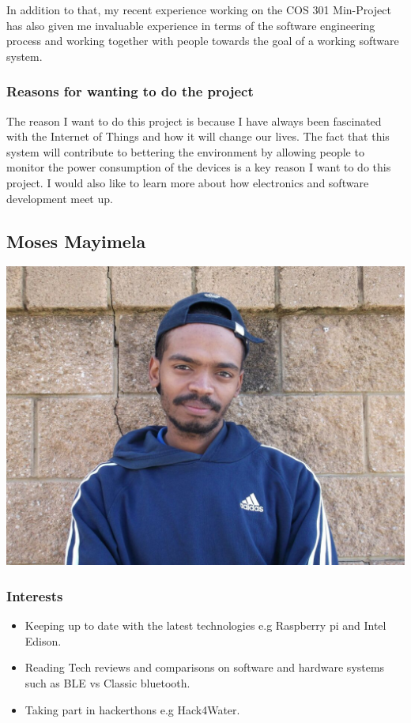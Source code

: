 \documentclass[a4paper,12pt]{article}
\begin{document}
In addition to that, my recent experience working on the COS 301 Min-Project has also given me invaluable experience in terms of the software engineering process and working together with people towards the goal of a working software system.
\subsubsection{Reasons for wanting to do the project}
The reason  I want to do this project is because I have always been fascinated with the Internet of Things and how it will change our lives. The fact that this system will contribute to bettering the environment by allowing people to monitor the power consumption of the devices is a key reason I want to do this project. I would also like to learn more about how electronics and software development meet up.
\newpage
\subsection{Moses Mayimela}
\includegraphics[width=\textwidth]{images/Moses}
\subsubsection{Interests}
\begin{itemize}
\item Keeping up to date with the latest technologies e.g Raspberry pi and Intel Edison.
\item Reading Tech reviews and comparisons on software and hardware systems such as BLE vs Classic bluetooth.
\item Taking part in hackerthons e.g Hack4Water.
\end{itemize}
\end{document}
